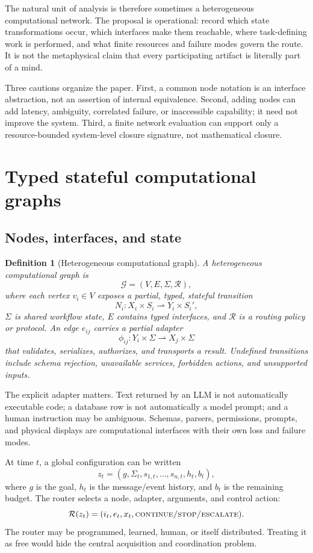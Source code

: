 \documentclass[10pt]{article}
\newtheorem{definition}{Definition}
\begin{document}
The natural unit of analysis is therefore sometimes a heterogeneous computational network. The proposal is operational: record which state transformations occur, which interfaces make them reachable, where task-defining work is performed, and what finite resources and failure modes govern the route. It is not the metaphysical claim that every participating artifact is literally part of a mind.

Three cautions organize the paper. First, a common node notation is an interface abstraction, not an assertion of internal equivalence. Second, adding nodes can add latency, ambiguity, correlated failure, or inaccessible capability; it need not improve the system. Third, a finite network evaluation can support only a resource-bounded system-level closure signature, not mathematical closure.

\section{Typed stateful computational graphs}

\subsection{Nodes, interfaces, and state}

\begin{definition}[Heterogeneous computational graph]
A heterogeneous computational graph is
\[
\mathcal G=(V,E,\Sigma,\mathcal R),
\]
where each vertex $v_i\in V$ exposes a partial, typed, stateful transition
\[
N_i:X_i\times S_i\rightharpoonup Y_i\times S_i',
\]
$\Sigma$ is shared workflow state, $E$ contains typed interfaces, and $\mathcal R$ is a routing policy or protocol. An edge $e_{ij}$ carries a partial adapter
\[
\phi_{ij}:Y_i\times\Sigma\rightharpoonup X_j\times\Sigma
\]
that validates, serializes, authorizes, and transports a result. Undefined transitions include schema rejection, unavailable services, forbidden actions, and unsupported inputs.
\end{definition}

The explicit adapter matters. Text returned by an LLM is not automatically executable code; a database row is not automatically a model prompt; and a human instruction may be ambiguous. Schemas, parsers, permissions, prompts, and physical displays are computational interfaces with their own loss and failure modes.

At time $t$, a global configuration can be written
\[
z_t=(g,\Sigma_t,s_{1,t},\ldots,s_{n,t},h_t,b_t),
\]
where $g$ is the goal, $h_t$ is the message/event history, and $b_t$ is the remaining budget. The router selects a node, adapter, arguments, and control action:
\[
\mathcal R(z_t)=(i_t,e_t,x_t,\textsc{continue/stop/escalate}).
\]
The router may be programmed, learned, human, or itself distributed. Treating it as free would hide the central acquisition and coordination problem.
\end{document}
